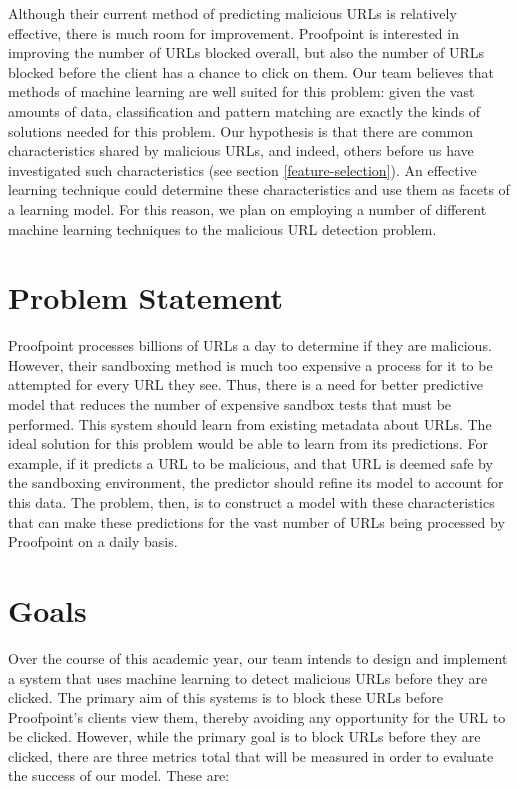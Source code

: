 \documentclass[cs,proposal]{hmcclinic}
\begin{document}
Although their current method of predicting malicious URLs is relatively effective, there is much room for improvement. Proofpoint is interested in improving the number of URLs blocked overall, but also the number of URLs blocked before the client has a chance to click on them. Our team believes that methods of machine learning are well suited for this problem: given the vast amounts of data, classification and pattern matching are exactly the kinds of solutions needed for this problem. Our hypothesis is that there are common characteristics shared by malicious URLs, and indeed, others before us have investigated such characteristics (see section \ref{feature-selection}). An effective learning technique could determine these characteristics and use them as facets of a learning model. For this reason, we plan on employing a number of different machine learning techniques to the malicious URL detection problem.


\section{Problem Statement}

Proofpoint processes billions of URLs a day to determine if they are malicious. However, their sandboxing method is much too expensive a process for it to be attempted for every URL they see. Thus, there is a need for better predictive model that reduces the number of expensive sandbox tests that must be performed. This system should learn from existing metadata about URLs. The ideal solution for this problem would be able to learn from its predictions. For example, if it predicts a URL to be malicious, and that URL is deemed safe by the sandboxing environment, the predictor should refine its model to account for this data. The problem, then, is to construct a model with these characteristics that can make these predictions for the vast number of URLs being processed by Proofpoint on a daily basis.


\section{Goals}

Over the course of this academic year, our team intends to design and implement a system that uses machine learning to detect malicious URLs before they are clicked. The primary aim of this systems is to block these URLs before Proofpoint's clients view them, thereby avoiding any opportunity for the URL to be clicked. However, while the primary goal is to block URLs before they are clicked, there are three metrics total that will be measured in order to evaluate the success of our model. These are:
\end{document}
